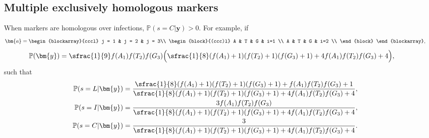 \subsection{Multiple exclusively homologous markers}\label{ex:multiple_markers_hom}
When markers are homologous over infections, $\mathbb{P}(s=C | \bm{y}) > 0$. For example, if
\begin{equation*}
\bm{a} = 
    \begin{blockarray}{cccl}
    j = 1 & j = 2 & j = 3\\
    \begin{block}{(ccc)l}
    A & T & G & i=1 \\
    A & T & G & i=2 \\
    \end{block}
    \end{blockarray},    
\end{equation*}
%
\begin{align*}
    \mathbb{P}(\bm{y}) &= 
    \sfrac{1}{9}f(A_1)f(T_2)f(G_3) 
        \Big(\sfrac{1}{8}(f(A_1)+1)(f(T_2)+1)(f(G_3)+1) + 
        4f(A_1)f(T_2)f(G_3) + 4\Big),
\end{align*}
such that
\begin{align*}
    \mathbb{P}(s=L|\bm{y})&= 
    \dfrac{\sfrac{1}{8}(f(A_1)+1)(f(T_2)+1)(f(G_3)+1) 
        + f(A_1)f(T_2)f(G_3) + 1}{
        \sfrac{1}{8}(f(A_1)+1)(f(T_2)+1)(f(G_3)+1) + 
        4f(A_1)f(T_2)f(G_3) + 4},
    \\
    \mathbb{P}(s=I|\bm{y})&= 
    \dfrac{3f(A_1)f(T_2)f(G_3)}
    {\sfrac{1}{8}(f(A_1)+1)(f(T_2)+1)(f(G_3)+1) + 4f(A_1)f(T_2)f(G_3) + 4},
    \\
    \mathbb{P}(s=C|\bm{y})&= 
    \dfrac{3}
    {\sfrac{1}{8}(f(A_1)+1)(f(T_2)+1)(f(G_3)+1) + 4f(A_1)f(T_2)f(G_3) + 4}.\\
\end{align*}


